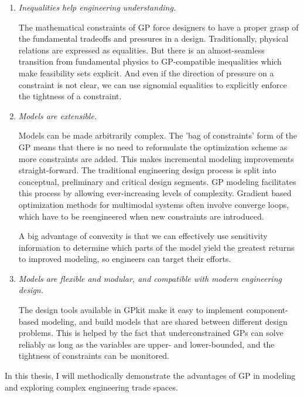 \begin{enumerate}

    \item \textit{Inequalities help engineering understanding.}

The mathematical constraints of \gls{GP} force designers to have a proper grasp
of the fundamental tradeoffs and pressures in a design.
    Traditionally, physical relations are expressed as equalities. But there is an
almost-seamless transition from fundamental physics to GP-compatible
inequalities which make feasibility sets explicit.
And even if the direction of pressure on a constraint is not clear,
we can use signomial equalities to explicitly enforce the tightness of a
    constraint.

    \item \textit{Models are extensible.}
    
Models can be made arbitrarily complex. The 'bag of constraints' form of the GP
means that there is no need to reformulate the optimization scheme as more
constraints are added. This makes incremental modeling improvements straight-forward.
The traditional engineering design process is split into conceptual, preliminary
and critical design segments. GP modeling facilitates this process by allowing
ever-increasing levels of complexity. Gradient based optimization methods for
multimodal systems often involve
converge loops, which have to be reengineered when new constraints are
introduced.

A big advantage of convexity is that we can effectively use sensitivity information
to determine which parts of the
model yield the greatest returns to improved modeling, so engineers can target
their efforts.

    \item \textit{Models are flexible and modular, and compatible with modern
    engineering design.}

The design tools available in GPkit make it easy to
implement component-based modeling, and build models that are shared between
different design problems.
This is helped by the fact that underconstrained \gls{GP}s can solve reliably as long as
    the variables are upper- and lower-bounded,
and the tightness of constraints can be monitored.

\end{enumerate}

In this thesis, I will methodically demonstrate the advantages of \gls{GP} in modeling
and exploring complex engineering trade spaces.



